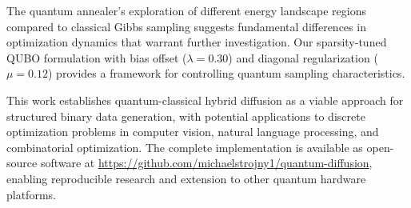 \documentclass[11pt]{article}
\begin{document}
The quantum annealer's exploration of different energy landscape regions compared to classical Gibbs sampling suggests fundamental differences in optimization dynamics that warrant further investigation. Our sparsity-tuned QUBO formulation with bias offset ($\lambda = 0.30$) and diagonal regularization ($\mu = 0.12$) provides a framework for controlling quantum sampling characteristics.

This work establishes quantum-classical hybrid diffusion as a viable approach for structured binary data generation, with potential applications to discrete optimization problems in computer vision, natural language processing, and combinatorial optimization. The complete implementation is available as open-source software at \url{https://github.com/michaelstrojny1/quantum-diffusion}, enabling reproducible research and extension to other quantum hardware platforms.
\end{document}
